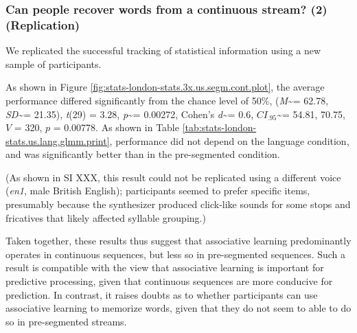 \documentclass[
]{article}
\newcommand{\T}{{\em t\/}}
\newcommand{\p}{{\em p\/}}
\newcommand{\M}{{\em M\/}}
\newcommand{\SD}{{\em SD\/}}
\newcommand{\D}{Cohen's {\em d\/}}
\newcommand{\CI}{$CI_{.95}$}
\begin{document}
\hypertarget{can-people-recover-words-from-a-continuous-stream-2-replication}{%
\subsubsection{Can people recover words from a continuous stream? (2)
(Replication)}\label{can-people-recover-words-from-a-continuous-stream-2-replication}}

We replicated the successful tracking of statistical information using a
new sample of participants.

As shown in Figure \ref{fig:stats-london-stats.3x.us.segm.cont.plot},
the average performance differed significantly from the chance level of
50\%, (\M\textasciitilde= 62.78, \SD\textasciitilde= 21.35), \T(29) =
3.28, \p\textasciitilde= 0.00272, \D\textasciitilde= 0.6,
\CI\textasciitilde= 54.81, 70.75, \(V\) = 320, \(p\) = 0.00778. As shown
in Table \ref{tab:stats-london-stats.us.lang.glmm.print}, performance
did not depend on the language condition, and was significantly better
than in the pre-segmented condition.

(As shown in SI XXX, this result could not be replicated using a
different voice (\emph{en1}, male British English); participants seemed
to prefer specific items, presumably because the synthesizer produced
click-like sounds for some stops and fricatives that likely affected
syllable grouping.)

Taken together, these results thus suggest that associative learning
predominantly operates in continuous sequences, but less so in
pre-segmented sequences. Such a result is compatible with the view that
associative learning is important for predictive processing, given that
continuous sequences are more conducive for prediction. In contrast, it
raises doubts as to whether participants can use associative learning to
memorize words, given that they do not seem to able to do so in
pre-segmented streams.
\end{document}
